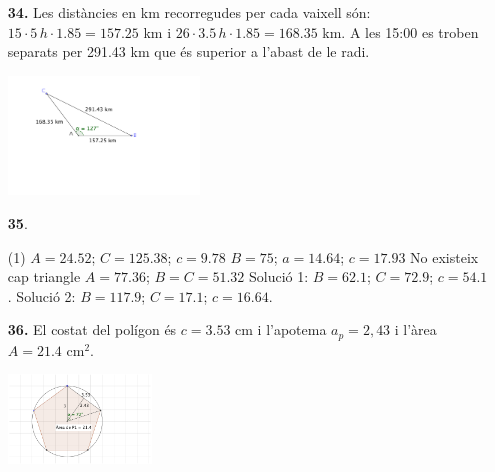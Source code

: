 \documentclass[a4paper, pdf, twoside]{book}
\begin{document}
\begin{multicols}{2}
\begin{enumerate}
\vspace{0.25cm}
\item[\fontfamily{phv}\selectfont\color{blue}\textbf{34. }] 
Les distàncies en km recorregudes per cada vaixell són: $15\cdot 5 \, h \cdot 1.85=157.25$ km i $26\cdot 3.5 \,h \cdot 1.85=168.35$ km. A les 15:00 es troben separats per 291.43 km que és superior a l'abast de le radi.\par \includegraphics [width=0.4\textwidth ]{img-sol/t3-34}
\vspace{0.25cm}



 \item[\fontfamily{phv}\selectfont\color{blue}\textbf{35}. ] 
 \begin{tasks}[column-sep=1em, item-indent=1.3333em](1)
	 \task*  $A=24.52$; $C=125.38$; $c=9.78$
	 \task $B=75$; $a=14.64$; $c=17.93$
	 \task No existeix cap triangle
	 \task $A=77.36$; $B=C=51.32$
	 \task* Solució 1: $B=62.1$; $C=72.9$; $c=54.1$. Solució 2: $B=117.9$; $C=17.1$; $c=16.64$.
\end{tasks}
\vspace{0.25cm}
\item[\fontfamily{phv}\selectfont\color{blue}\textbf{36. }] 
El costat del polígon és $c=3.53$ cm i l'apotema $a_p=2,43$ i l'àrea $A=21.4$ cm$^2$.\par \includegraphics [width=0.3\textwidth ]{img-sol/t3-36}
 \end{enumerate}
\vspace{0.3cm}



\end{multicols}
\end{document}

